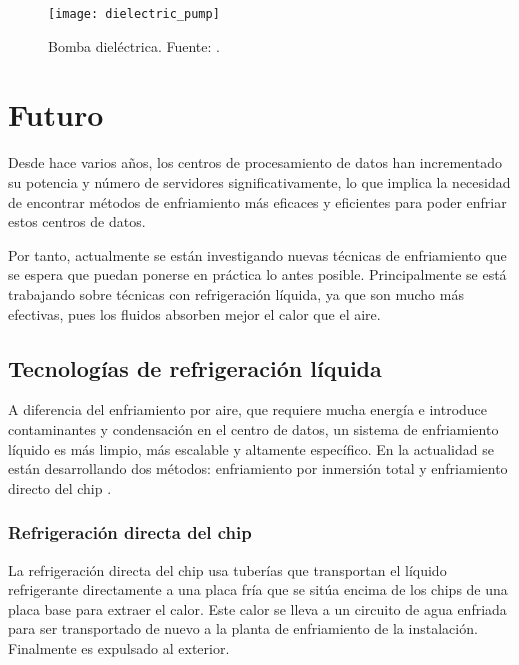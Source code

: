 \begin{figure}[H]
    \begin{center}
        \texttt{[image: dielectric\_pump]}
        \caption{Bomba dieléctrica. Fuente: \cite{Kelvion}.}
        \label{dielectric_pump}
    \end{center}
\end{figure}

\section{Futuro} \label{futuro}

Desde hace varios años, los centros de procesamiento de datos han incrementado su potencia y número de servidores significativamente, lo que implica la necesidad de encontrar métodos de enfriamiento más eficaces y eficientes para poder enfriar estos centros de datos.

Por tanto, actualmente se están investigando nuevas técnicas de enfriamiento que se espera que puedan ponerse en práctica lo antes posible. Principalmente se está trabajando sobre técnicas con refrigeración líquida, ya que son mucho más efectivas, pues los fluidos absorben mejor el calor que el aire.

\subsection{Tecnologías de refrigeración líquida}

A diferencia del enfriamiento por aire, que requiere mucha energía e introduce contaminantes y condensación en el centro de datos, un sistema de enfriamiento líquido es más limpio, más escalable y altamente específico. En la actualidad se están desarrollando dos métodos: enfriamiento por inmersión total y enfriamiento directo del chip \cite{datacenters-future}.

\subsubsection{Refrigeración directa del chip}

La refrigeración directa del chip usa tuberías que transportan el líquido refrigerante directamente a una placa fría que se sitúa encima de los chips de una placa base para extraer el calor. Este calor se lleva a un circuito de agua enfriada para ser transportado de nuevo a la planta de enfriamiento de la instalación. Finalmente es expulsado al exterior.

